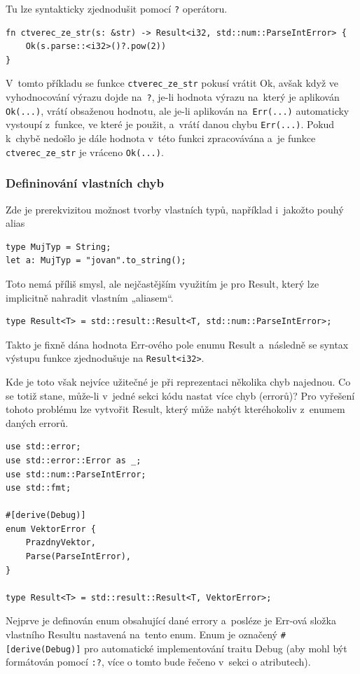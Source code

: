 \documentclass[a4paper, 12pt, twoside]{article} %
\newcommand{\rust}[1]{\texttt{#1}}
\begin{document}
		Tu lze syntakticky zjednodušit pomocí \rust{?} operátoru.
		\begin{verbatim}
fn ctverec_ze_str(s: &str) -> Result<i32, std::num::ParseIntError> {
	Ok(s.parse::<i32>()?.pow(2))
}
		\end{verbatim}

		V~tomto příkladu se funkce \rust{ctverec_ze_str} pokusí vrátit Ok, avšak když ve vyhodnocování výrazu dojde na~\rust{?}, je-li hodnota výrazu na~který je aplikován \rust{Ok(...)}, vrátí obsaženou hodnotu, ale je-li aplikován na~\rust{Err(...)} automaticky vystoupí z~funkce, ve které je použit, a~vrátí danou chybu \rust{Err(...)}. Pokud k~chybě nedošlo je dále hodnota v~této funkci zpracovávána a~je funkce \rust{ctverec_ze_str} je vráceno \rust{Ok(...)}.
		
		\subsubsection*{Defininování vlastních chyb}
			Zde je prerekvizitou možnost tvorby vlastních typů, například i~jakožto pouhý alias
			\begin{verbatim}
type MujTyp = String;
let a: MujTyp = "jovan".to_string();
			\end{verbatim}
		
			Toto nemá příliš smysl, ale nejčastějším využitím je pro Result, který lze implicitně nahradit vlastním „aliasem“.
			\begin{verbatim}
type Result<T> = std::result::Result<T, std::num::ParseIntError>;
			\end{verbatim}
			
			Takto je fixně dána hodnota Err-ového pole enumu Result a~následně se syntax výstupu funkce zjednodušuje na \rust{Result<i32>}.

			Kde je toto však nejvíce užitečné je při reprezentaci několika chyb najednou. Co se totiž stane, může-li v~jedné sekci kódu nastat více chyb (errorů)? Pro vyřešení tohoto problému lze vytvořit Result, který může nabýt kteréhokoliv z~enumem daných errorů.
			\begin{verbatim}
use std::error;
use std::error::Error as _;
use std::num::ParseIntError;
use std::fmt;

#[derive(Debug)]
enum VektorError {
	PrazdnyVektor,
	Parse(ParseIntError),
}

type Result<T> = std::result::Result<T, VektorError>;
			\end{verbatim}
			
			Nejprve je definován enum obsahující dané errory a~posléze je Err-ová složka vlastního Resultu nastavená na~tento enum. Enum je označený \rust{#[derive(Debug)]} pro automatické implementování traitu Debug (aby mohl být formátován pomocí \rust{:?}, více o tomto bude řečeno v~sekci o atributech).
			
\end{document}
